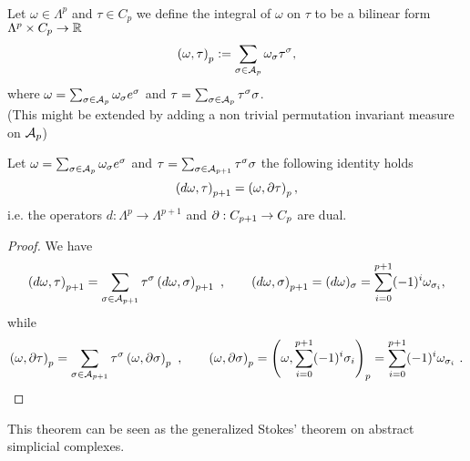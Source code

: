 \documentclass[../1.tex]{subfiles}
\begin{document}
    \begin{defn}
        \\
        Let $\omega \in \Lambda^p$ and $\tau \in C_p$ we define the integral of $\omega$ on $\tau$ to be a bilinear form $\Lambda^p \times C_p \to \mathbb{R}$
        \[ \left(\omega, \tau \right)_p := \sum_{\sigma \in \mathcal{A}_p} \omega_\sigma \tau^\sigma, \]
        where $\omega = \sum_{\sigma \in \mathcal{A}_p} \omega_\sigma e^\sigma$ and $\tau = \sum_{\sigma \in \mathcal{A}_p} \tau^\sigma \sigma$.\\
        (This might be extended by adding a non trivial permutation invariant measure on $\mathcal{A}_p$)
    \end{defn}
    \newpage
    \begin{thm}
        Let $\omega = \sum_{\sigma \in \mathcal{A}_p} \omega_\sigma e^\sigma$ and $\tau = \sum_{\sigma \in \mathcal{A}_{p+1}} \tau^\sigma \sigma$ the following identity holds
        \[ \left(d \omega, \tau \right)_{p+1} = \left(\omega, \partial \tau \right)_p, \]
        i.e. the operators $d : \Lambda^p \to \Lambda^{p+1}$ and $\partial : C_{p+1} \to C_p$ are dual.
    \end{thm}
    \begin{proof}
        We have\\
        \[ \left( d \omega, \tau \right)_{p+1} = \sum_{\sigma \in \mathcal{A}_{p+1}} \tau^\sigma \left( d \omega, \sigma \right)_{p+1} \ , \quad
        \quad \left( d \omega, \sigma \right)_{p+1} = (d \omega)_\sigma = \sum_{i = 0}^{p+1} (-1)^i \omega_{\sigma_i}, \]
        while
        \[ \left( \omega, \partial \tau \right)_p = \sum_{\sigma \in \mathcal{A}_{p+1}} \tau^\sigma \left( \omega, \partial \sigma \right)_p \ , \quad
        \quad \left( \omega, \partial \sigma \right)_p = \left( \omega, \sum_{i = 0}^{p+1} (-1)^i \sigma_i \right)_p = \sum_{i = 0}^{p+1} (-1)^i \omega_{\sigma_i} \ . \]
    \end{proof}
    This theorem can be seen as the generalized Stokes' theorem on abstract simplicial complexes.
\end{document}
